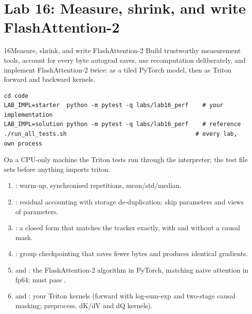 \section{Lab 16: Measure, shrink, and write FlashAttention-2}\label{sec:perf:lab}
\begin{labbox}{16}{Measure, shrink, and write FlashAttention-2}
Build trustworthy measurement tools, account for every byte autograd saves, use recomputation
deliberately, and implement FlashAttention-2 twice: as a tiled PyTorch model, then as Triton
forward and backward kernels.

\begin{lstlisting}[style=shell]
cd code
LAB_IMPL=starter  python -m pytest -q labs/lab16_perf    # your implementation
LAB_IMPL=solution python -m pytest -q labs/lab16_perf    # reference
./run_all_tests.sh                                     # every lab, own process
\end{lstlisting}
On a CPU-only machine the Triton tests run through the interpreter; the test file sets
 before anything imports triton.

\begin{enumerate}
\item {}: warm-up, synchronised repetitions, mean/std/median.
\item {}: residual accounting with storage de-duplication; skip
  parameters and views of parameters.
\item {}: a closed form that matches the tracker exactly, with and
  without a causal mask.
\item {}: group checkpointing that saves fewer bytes and produces identical
  gradients.
\item {} and : the FlashAttention-2 algorithm in
  PyTorch, matching naive attention in fp64;  must pass
  .
\item {} and : your Triton kernels (forward with
  log-sum-exp and two-stage causal masking; preprocess, dK/dV and dQ kernels).
\end{enumerate}


\end{labbox}
